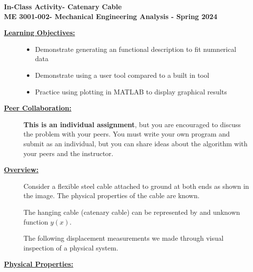 \documentclass[12pt]{article}
\newcommand{\COURNAME}{ME 3001-002}
\newcommand{\CURRTERM}{Spring 2024} %
\newcommand{\ANUM}{8} %
\newcommand{\activitytitle}{Catenary Cable} %
\begin{document}
\thispagestyle{plain}

\begin{center}
   {\bf \Large In-Class Activity\hspc\ANUM\hspc - \activitytitle}\vspace{3mm}\\
   {\bf \large \COURNAME - Mechanical Engineering Analysis - \CURRTERM} \vspace{5mm}\\
\end{center}

\begin{description}


\item[\textbf{\underline{Learning Objectives:}}] \hfill \vspace{0mm}

\begin{itemize}
	\item Demonstrate generating an functional description to fit numnerical data
	\item Demonstrate using a user tool compared to a built in tool
	\item Practice using plotting in MATLAB to display graphical results
\end{itemize}

\item[\textbf{\underline{Peer Collaboration:}}] \hfill \vspace{0mm}
	
	{\bf This is an individual assignment}, but you are encouraged to discuss the problem with your peers. You must write your own program and submit as an individual, but you can share ideas about the algorithm with your peers and the instructor.

\item[\textbf{\underline{Overview:}}] \hfill \vspace{0mm}


	Consider a flexible steel cable attached to ground at both ends as shown in the image. The physical properties of the cable are known. 

   The hanging cable (catenary cable) can be represented by and unknown function $y(x)$. 

   The following displacement measurements we made through visual inspection of a physical system.  


  \item[\textbf{\underline{Physical Properties:}}] \hfill \vspace{0mm}
  

\end{description}
\end{document}
